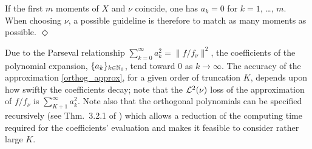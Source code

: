 \begin{remark}\label{Rem:27.10a}
If the first $m$ moments of $X$ and $\nu$ coincide, one has $a_k=0$ for $k=1$, \ldots, $m$.
When choosing $\nu$, a possible guideline is therefore to match as many moments as possible.
\hfill $\Diamond$
\end{remark}

Due to the Parseval relationship $\sum_{k=0}^\infty a_k^2=\|f/f_\nu\|^2$, the coefficients of the polynomial expansion, $\{a_k\}_{k\in\mathbb{N}_0}$, tend toward $0$ as $k \to \infty$.
The accuracy of the approximation \eqref{orthog_approx}, for a given order of truncation $K$, depends upon how swiftly the coefficients decay; note that the $\mathcal{L}^{2}(\nu)$ loss of the approximation of $f/f_\nu$ is $\sum_{K+1}^{\infty}a_k^2$.
Note also that the orthogonal polynomials can be specified recursively
(see Thm.~3.2.1 of \cite{Szegoe1939}) which allows a reduction of the computing time required for the coefficients' evaluation
and makes it feasible to consider rather large $K$.


